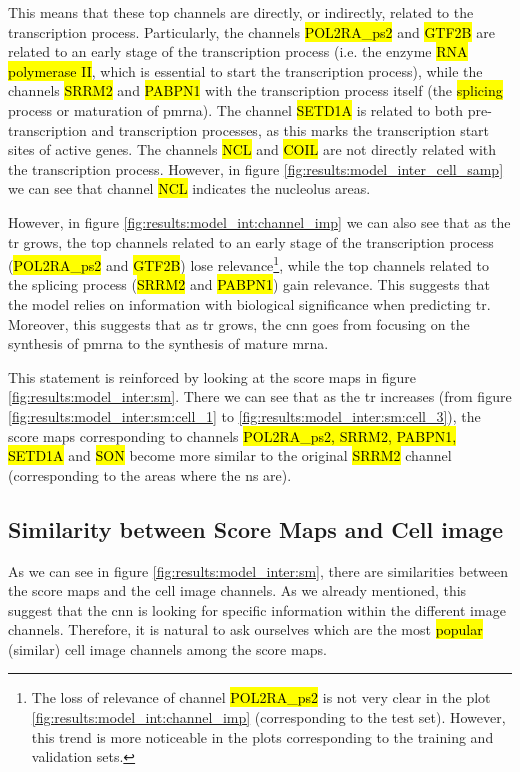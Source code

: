 This means that these top channels are directly, or indirectly, related to the transcription process. Particularly, the channels \hl{POL2RA\_ps2} and \hl{GTF2B} are related to an early stage of the transcription process (i.e. the enzyme \hl{RNA polymerase II}, which is essential to start the transcription process), while the channels \hl{SRRM2} and \hl{PABPN1} with the transcription process itself (the \hl{splicing} process or maturation of \gls{pmrna}). The channel \hl{SETD1A} is related to both pre-transcription and transcription processes, as this marks the transcription start sites of active genes. The channels \hl{NCL} and \hl{COIL} are not directly related with the transcription process. However, in figure \ref{fig:results:model_inter_cell_samp} we can see that channel \hl{NCL} indicates the nucleolus areas.

However, in figure \ref{fig:results:model_int:channel_imp} we can also see that as the \gls{tr} grows, the top channels related to an early stage of the transcription process (\hl{POL2RA\_ps2} and \hl{GTF2B}) lose relevance\footnote{The loss of relevance of channel \hl{POL2RA\_ps2} is not very clear in the plot \ref{fig:results:model_int:channel_imp} (corresponding to the test set). However, this trend is more noticeable in the plots corresponding to the training and validation sets.}, while the top channels related to the splicing process (\hl{SRRM2} and \hl{PABPN1}) gain relevance.
This suggests that the model relies on information with biological significance when predicting \gls{tr}. Moreover, this suggests that as \gls{tr} grows, the \gls{cnn} goes from focusing on the synthesis of \gls{pmrna} to the synthesis of mature \gls{mrna}.

This statement is reinforced by looking at the score maps in figure \ref{fig:results:model_inter:sm}.
There we can see that as the \gls{tr} increases (from figure \ref{fig:results:model_inter:sm:cell_1} to \ref{fig:results:model_inter:sm:cell_3}), the score maps corresponding to channels \hl{POL2RA\_ps2, SRRM2, PABPN1, SETD1A} and \hl{SON} become more similar to the original \hl{SRRM2} channel (corresponding to the areas where the \gls{ns} are).

\subsection{Similarity between Score Maps and Cell image}
\label{sec:results:sim_sc_ci}

As we can see in figure \ref{fig:results:model_inter:sm}, there are similarities between the score maps and the cell image channels. As we already mentioned, this suggest that the \gls{cnn} is looking for specific information within the different image channels. Therefore, it is natural to ask ourselves which are the most \hl{popular} (similar) cell image channels among the score maps.

